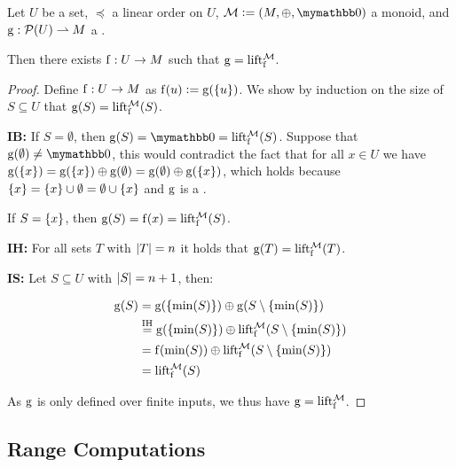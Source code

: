 \documentclass[conference]{IEEEtran}
\begin{document}
\begin{proposition}
Let $U$ be a set, $\preceq$ a linear order on $U$, $\mathcal{M} \defeq (M, \groupaddsym, \neutraladd)$ a monoid, and ${\operatorname{g}}: {\mathcal{P}({U})} \rightharpoonup{M}$ a \somewhatmorphism{}.

Then there exists ${\operatorname{f}}: {U} \rightarrow {M}$ such that $\operatorname{g} = \operatorname{lift_{\operatorname{f}}^{\mathcal{M}}}$.

\begin{proof}
Define ${\operatorname{f}}: {U} \rightarrow {M}$ as $\operatorname{f}(u) \vcentcolon= \operatorname{g}(\{u\})$. We show by induction on the size of $S \subseteq U$ that $\operatorname{g}(S) = \operatorname{lift_{f}^{\mathcal{M}}}(S)$.

\vspace{10pt}

\textbf{IB:} If $S = \emptyset$, then $\g(S) = \neutraladd = \lift{\f}{\mathcal{M}}(S)$. Suppose that $\g(\emptyset) \neq \neutraladd$, this would contradict the fact that for all $x \in U$ we have $\operatorname{g}(\{x\}) = \operatorname{g}(\{x\}) \oplus \operatorname{g}(\emptyset) = \operatorname{g}(\emptyset) \oplus \operatorname{g}(\{x\})$, which holds because $\{x\} = \{x\} \cup \emptyset = \emptyset \cup \{x\}$ and $\operatorname{g}$ is a \somewhatmorphism{}.

If $S = \{x\}$, then $\operatorname{g}(S) = \operatorname{f}(x) = \operatorname{lift_{\operatorname{f}}^{\mathcal{M}}}(S)$.

\textbf{IH:} For all sets $T$ with $|{T}| = n$ it holds that $\operatorname{g}(T) = \operatorname{lift_{\operatorname{f}}^{\mathcal{M}}}(T)$.

\textbf{IS:} Let $S \subseteq U$ with $|{S}| = n + 1$, then:

\begin{align*}
\operatorname{g}(S) &= \operatorname{g}(\{\min(S)\}) \oplus \operatorname{g}(S \setminus \{\min(S)\})\\
&\overset{\text{IH}}= \operatorname{g}(\{\min(S)\}) \oplus \operatorname{lift_{\operatorname{f}}^{\mathcal{M}}}(S \setminus \{\min(S)\})\\
&= \operatorname{f}(\min(S)) \oplus \operatorname{lift_{\operatorname{f}}^{\mathcal{M}}}(S \setminus \{\min(S)\})\\
&= \operatorname{lift_{\operatorname{f}}^{\mathcal{M}}}(S)\\
\end{align*}

\vspace{10pt}
As $\operatorname{g}$ is only defined over finite inputs, we thus have $\operatorname{g} = \operatorname{lift_{\operatorname{f}}^{\mathcal{M}}}$.
\end{proof}
\end{proposition}

\subsection{Range Computations}
\end{document}

